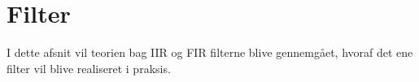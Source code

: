 \chapter{Filter}\label{kap:filter}
I dette afsnit vil teorien bag IIR og FIR filterne blive gennemgået, hvoraf det ene filter vil blive realiseret i praksis. 